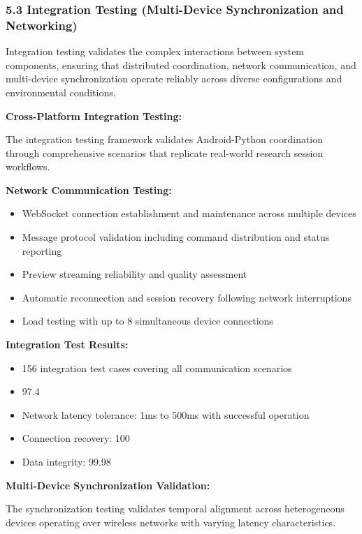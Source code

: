 \documentclass[12pt,a4paper]{report}
\begin{document}
\subsubsection{5.3 Integration Testing (Multi-Device Synchronization and Networking)}

Integration testing validates the complex interactions between system components, ensuring that distributed
coordination, network communication, and multi-device synchronization operate reliably across diverse configurations and
environmental conditions.

\textbf{Cross-Platform Integration Testing:}

The integration testing framework validates Android-Python coordination through comprehensive scenarios that replicate
real-world research session workflows.

\textbf{Network Communication Testing:}

\begin{itemize}
\item WebSocket connection establishment and maintenance across multiple devices
\item Message protocol validation including command distribution and status reporting
\item Preview streaming reliability and quality assessment
\item Automatic reconnection and session recovery following network interruptions
\item Load testing with up to 8 simultaneous device connections

\end{itemize}
\textbf{Integration Test Results:}

\begin{itemize}
\item 156 integration test cases covering all communication scenarios
\item 97.4%
\item Network latency tolerance: 1ms to 500ms with successful operation
\item Connection recovery: 100%
\item Data integrity: 99.98%

\end{itemize}
\textbf{Multi-Device Synchronization Validation:}

The synchronization testing validates temporal alignment across heterogeneous devices operating over wireless networks
with varying latency characteristics.
\end{document}
